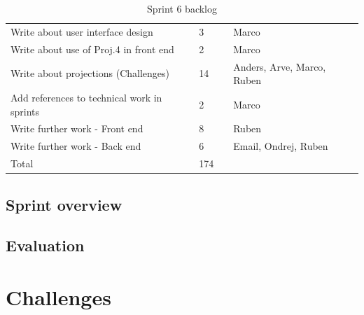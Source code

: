 \documentclass[11pt,a4paper,titlepage,oneside]{report}
\begin{document}
\begin{table}[h]
{\begin{tabular}{llll}
Write about user interface design                      & 3                                                                   &                                                         & Marco                      \\
Write about use of Proj.4 in front end                 & 2                                                                   &                                                         & Marco                      \\
Write about projections (Challenges)                   & 14                                                                  &                                                         & Anders, Arve, Marco, Ruben \\
Add references to technical work in sprints            & 2                                                                   &                                                         & Marco                      \\
Write further work - Front end                         & 8                                                                   &                                                         & Ruben                      \\
Write further work - Back end                          & 6                                                                   &                                                         & Email, Ondrej, Ruben       \\
\rowcolor[HTML]{C0C0C0} 
Total                                                  & 174                                                                 &                                                         &                           
\end{tabular}
}
\caption{Sprint 6 backlog}
\label{tab:Sprint6Backlog}
\end{table}

\section{Sprint overview}
\section{Evaluation}

\chapter{Challenges}
\end{document}
